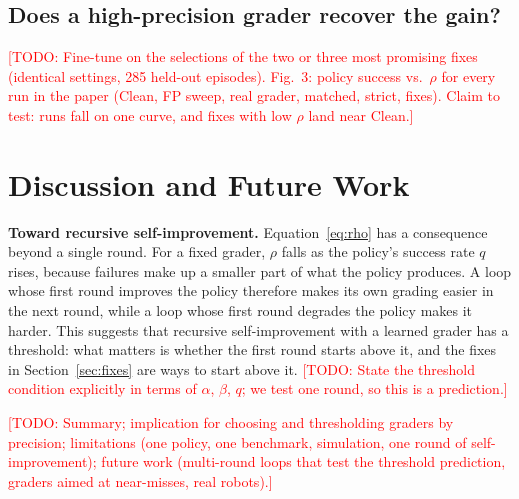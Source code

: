 \documentclass[letterpaper, journal, twoside]{IEEEtran}
\newcommand{\todo}[1]{\textcolor{red}{[TODO: #1]}}
\begin{document}
\subsection{Does a high-precision grader recover the gain?}
\todo{Fine-tune on the selections of the two or three most promising fixes (identical settings, 285 held-out episodes).
Fig.~3: policy success vs.\ $\rho$ for every run in the paper (Clean, FP sweep, real grader, matched, strict, fixes).
Claim to test: runs fall on one curve, and fixes with low $\rho$ land near Clean.}

\section{Discussion and Future Work}

\textbf{Toward recursive self-improvement.} Equation~\eqref{eq:rho} has a consequence beyond a single round. For a
fixed grader, $\rho$ falls as the policy's success rate $q$ rises, because failures make up a smaller part of what the
policy produces. A loop whose first round improves the policy therefore makes its own grading easier in the next round,
while a loop whose first round degrades the policy makes it harder. This suggests that recursive self-improvement with
a learned grader has a threshold: what matters is whether the first round starts above it, and the fixes in
Section~\ref{sec:fixes} are ways to start above it. \todo{State the threshold condition explicitly in terms of $\alpha$,
$\beta$, $q$; we test one round, so this is a prediction.}

\todo{Summary; implication for choosing and thresholding graders by precision; limitations (one policy, one benchmark,
simulation, one round of self-improvement); future work (multi-round loops that test the threshold prediction, graders
aimed at near-misses, real robots).}



\end{document}
